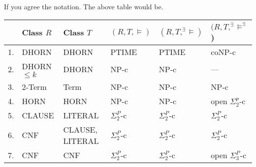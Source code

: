 \documentclass[12pt]{article}
\begin{document}
\color{red}
\noindent If you agree the notation. The above table would be.\\

\noindent\begin{tabular}{|l|l|l|l|l|l|}
\hline
 & {Class $R$ } & Class $T$ &  $(R,T,\models)$ & $(R, T, ^\exists\!\models)$ & $(R, T,^\exists\!\models^\exists$) \\ \hline
1. & DHORN & DHORN          & PTIME & PTIME  & coNP-c         \\ \hline
2. & DHORN $\leq k$ & DHORN & NP-c  & NP-c   & ---         \\ \hline
3. & 2-Term & Term          & NP-c  & NP-c   & NP-c           \\ \hline
4. & HORN & HORN                       & NP-c  & NP-c   & open $\Sigma^p_2$-c \\ \hline
5. & CLAUSE & LITERAL       & $\Sigma_2^P$-c & $\Sigma_2^P$-c & $\Sigma_2^P$-c \\ \hline
6. & CNF & CLAUSE, LITERAL  & $\Sigma_2^P$-c & $\Sigma_2^P$-c & $\Sigma_2^P$-c \\ \hline
7. & CNF & CNF              & $\Sigma_2^P$-c & $\Sigma_2^P$-c & open $\Sigma_3^P$-c \\ \hline
\end{tabular}





\color{black}




\vspace*{5mm}
\end{document}
